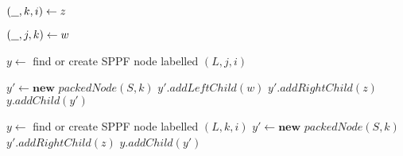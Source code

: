\begin{algorithmic}
    \State $(\underline{\hspace{0.25cm}}, k, i) \gets z$
    
        \State $(\underline{\hspace{0.25cm}}, j, k) \gets w$
    
        \State $y \gets$ find or create SPPF node labelled $(L, j, i)$  
    
            \State $y\prime \gets \textbf{new}$ $packedNode(S, k)$
            \State $y\prime.addLeftChild(w)$
            \State $y\prime.addRightChild(z)$
            \State $y.addChild(y\prime)$
        \EndIf
    
    \Else
        \State $y \gets$ find or create SPPF node labelled $(L, k, i)$ 
            \State $y\prime \gets \textbf{new}$ $packedNode(S, k)$
            \State $y\prime.addRightChild(z)$
            \State $y.addChild(y\prime)$
        \EndIf
    \EndIf
    \State {}
\EndFunction
\end{algorithmic}